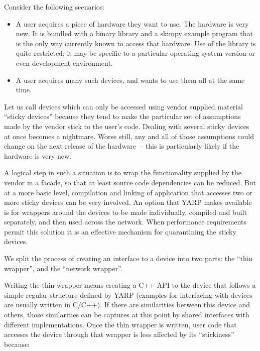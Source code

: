 Consider the following scenarios:

\begin{itemize}

\item A user acquires a piece of hardware they want to use.  The
hardware is very new.  It is bundled with a binary library and a
skimpy example program that is the only way currently known to access
that hardware.  Use of the library is quite restricted; it may be
specific to a particular operating system version or even development
environment.

\item A user acquires many such devices, and wants to use them
all at the same time.

\end{itemize}

Let us call devices which can only be accessed using vendor supplied
material ``sticky devices'' because they tend to make the particular
set of assumptions made by the vendor stick to the user's code.
Dealing with several sticky devices at once becomes a nightmare.
Worse still, any and all of those assumptions could change on the
next release of the hardware~-- this is particularly likely if the 
hardware is very new.

A logical step in such a situation is to wrap the functionality
supplied by the vendor in a facade, so that at least source code
dependencies can be reduced.  But at a more basic level,
compilation and linking of application that accesses two or more
sticky devices can be very involved.  An option that YARP makes
available is for wrappers around the devices to be made individually,
compiled and built separately, and then used across the network.
When performance requirements permit this solution it is an
effective mechanism for quarantining the sticky devices.

We split the process of creating an interface to a device into two
parts: the ``thin wrapper'', and the ``network wrapper''.  

Writing the thin wrapper means creating a C++ API to the device
that follows a simple regular structure defined by YARP
(examples for interfacing with devices are usually written in C/C++).
If there are similarities between this device and others,
those similarities can be captures at this point by 
shared interfaces with different implementations.
Once the thin wrapper is written, user code that accesses
the device through that wrapper is less affected by its ``stickiness''
because:

